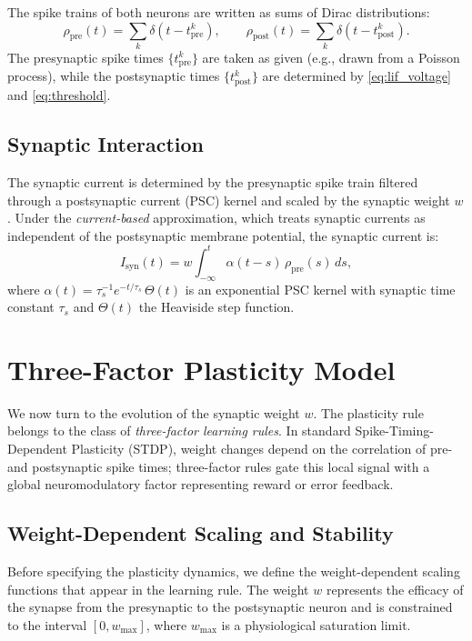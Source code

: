 \documentclass[11pt]{article}
\theoremstyle{definition}
\begin{document}
The spike trains of both neurons are written as sums of Dirac distributions:
\begin{equation} \label{eq:spike_trains}
    \rho_{\mathrm{pre}}(t) = \sum_{k} \delta(t - t_{\mathrm{pre}}^k), \qquad
    \rho_{\mathrm{post}}(t) = \sum_{k} \delta(t - t_{\mathrm{post}}^k).
\end{equation}
The presynaptic spike times $\{t_{\mathrm{pre}}^k\}$ are taken as given (e.g., drawn from a Poisson process), while the postsynaptic times $\{t_{\mathrm{post}}^k\}$ are determined by \eqref{eq:lif_voltage} and \eqref{eq:threshold}.

\subsection{Synaptic Interaction}
The synaptic current is determined by the presynaptic spike train filtered through a postsynaptic current (PSC) kernel and scaled by the synaptic weight $w$. Under the \textit{current-based} approximation, which treats synaptic currents as independent of the postsynaptic membrane potential, the synaptic current is:
\begin{equation} \label{eq:synaptic_current}
    I_{\mathrm{syn}}(t) = w \int_{-\infty}^{t} \alpha(t - s)\, \rho_{\mathrm{pre}}(s) \, ds,
\end{equation}
where $\alpha(t) = \tau_s^{-1} e^{-t/\tau_s}\, \Theta(t)$ is an exponential PSC kernel with synaptic time constant $\tau_s$ and $\Theta(t)$ the Heaviside step function.

\section{Three-Factor Plasticity Model}

We now turn to the evolution of the synaptic weight $w$. The plasticity rule belongs to the class of \textit{three-factor learning rules}. In standard Spike-Timing-Dependent Plasticity (STDP), weight changes depend on the correlation of pre- and postsynaptic spike times; three-factor rules gate this local signal with a global neuromodulatory factor representing reward or error feedback.

\subsection{Weight-Dependent Scaling and Stability} \label{sec:weight_constraints}
Before specifying the plasticity dynamics, we define the weight-dependent scaling functions that appear in the learning rule. The weight $w$ represents the efficacy of the synapse from the presynaptic to the postsynaptic neuron and is constrained to the interval $[0, w_{\mathrm{max}}]$, where $w_{\mathrm{max}}$ is a physiological saturation limit.
\end{document}
